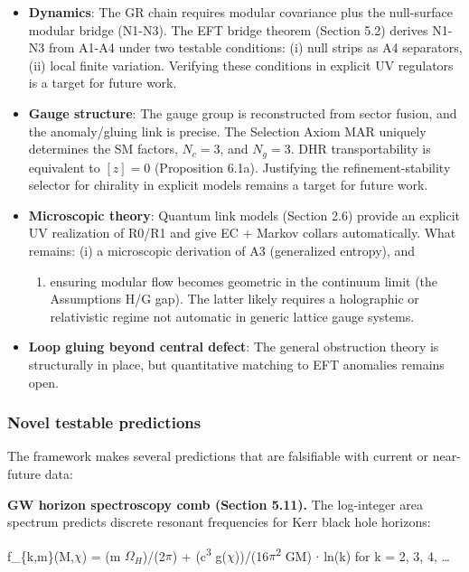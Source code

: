 \documentclass[11pt,a4paper]{article}
\theoremstyle{remark}
\providecommand{\tightlist}{%
  \setlength{\itemsep}{0pt}\setlength{\parskip}{0pt}}
\begin{document}
\begin{itemize}
\tightlist
\item
  \textbf{Dynamics}: The GR chain requires modular covariance plus the null-surface
  modular bridge (N1-N3). The EFT bridge theorem (Section 5.2) derives
  N1-N3 from A1-A4 under two testable conditions: (i) null strips as A4
  separators, (ii) local finite variation. Verifying these conditions in explicit UV regulators is a target for future work.
\item
  \textbf{Gauge structure}: The gauge group is reconstructed from sector fusion,
  and the anomaly/gluing link is precise. The Selection Axiom MAR uniquely
  determines the SM factors, \(N_c = 3\), and \(N_g = 3\). DHR transportability
  is equivalent to \([z]=0\) (Proposition 6.1a). Justifying the
  refinement-stability selector for chirality in explicit models remains
  a target for future work.
\item
  \textbf{Microscopic theory}: Quantum link models (Section 2.6) provide an
  explicit UV realization of R0/R1 and give EC + Markov collars automatically.
  What remains: (i) a microscopic derivation of A3 (generalized entropy), and

  \begin{enumerate}
  \def\labelenumi{(\roman{enumi})}
  \setcounter{enumi}{1}
  \tightlist
  \item
    ensuring modular flow becomes geometric in the continuum limit (the
    Assumptions H/G gap). The latter likely requires a holographic or relativistic
    regime not automatic in generic lattice gauge systems.
  \end{enumerate}
\item
  \textbf{Loop gluing beyond central defect}: The general obstruction theory is
  structurally in place, but quantitative matching to EFT anomalies remains
  open.
\end{itemize}

\subsubsection{Novel testable predictions}\label{novel-testable-predictions}

The framework makes several predictions that are falsifiable with current or
near-future data:

\textbf{GW horizon spectroscopy comb (Section 5.11).} The log-integer area spectrum predicts discrete resonant frequencies for Kerr black hole horizons:

f\_\{k,m\}(M,\ensuremath{\chi}) = (m $\Omega_H$)/(2\ensuremath{\pi}) + (c\textsuperscript{3} g(\ensuremath{\chi}))/(16\ensuremath{\pi}\textsuperscript{2} GM) \ensuremath{\cdot} ln(k) for k = 2, 3, 4, \ldots{}
\end{document}
